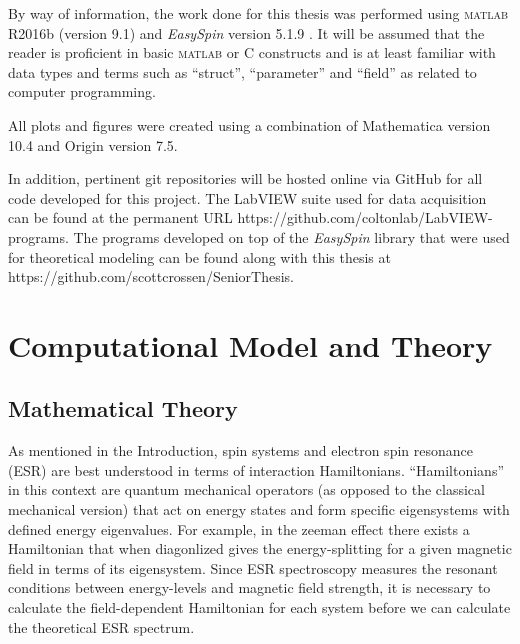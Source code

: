 \documentclass[oneside, noacknowlegments]{BYUPhys}
\begin{document}
By way of information, the work done for this thesis was performed using \textsc{matlab} R2016b (version 9.1) and \textit{EasySpin} version 5.1.9 . It will be assumed that the reader is proficient in basic \textsc{matlab} or C constructs and is at least familiar with data types and terms such as ``struct'', ``parameter'' and ``field'' as related to computer programming.

All plots and figures were created using a combination of Mathematica version 10.4 and Origin version 7.5.

In addition, pertinent git repositories will be hosted online via GitHub for all code developed for this project. The LabVIEW suite used for data acquisition can be found at the permanent URL https://github.com/coltonlab/LabVIEW-programs. The programs developed on top of the \textit{EasySpin} library that were used for theoretical modeling can be found along with this thesis at https://github.com/scottcrossen/SeniorThesis.










\chapter{Computational Model and Theory}

\section{Mathematical Theory}

As mentioned in the Introduction, spin systems and electron spin resonance (ESR) are best understood in terms of interaction Hamiltonians. ``Hamiltonians'' in this context are quantum mechanical operators (as opposed to the classical mechanical version) that act on energy states and form specific eigensystems with defined energy eigenvalues. For example, in the zeeman effect there exists a Hamiltonian that when diagonlized gives the energy-splitting for a given magnetic field in terms of its eigensystem. Since ESR spectroscopy measures the resonant conditions between energy-levels and magnetic field strength, it is necessary to calculate the field-dependent Hamiltonian for each system before we can calculate the theoretical ESR spectrum.
\end{document}
